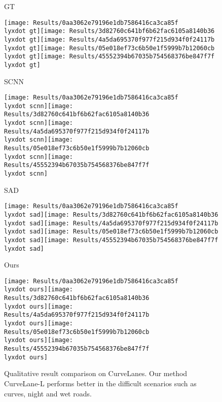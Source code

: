 \documentclass[runningheads]{llncs}
\newcommand{\lyxdot}{.}
\begin{document}
\begin{figure}[tb]
\begin{centering}
\begin{sideways}{GT}\end{sideways} \texttt{[image: Results/0aa3062e79196e1db7586416ca3ca85f\\lyxdot gt]}\texttt{[image: Results/3d82760c641bf6b62fac6105a8140b36\\lyxdot gt]}\texttt{[image: Results/4a5da695370f977f215d934f0f24117b\\lyxdot gt]}\texttt{[image: Results/05e018ef73c6b50e1f5999b7b12060cb\\lyxdot gt]}\texttt{[image: Results/45552394b67035b754568376be847f7f\\lyxdot gt]}
\par\end{centering}
\begin{centering}
\begin{sideways}{SCNN}\end{sideways} \texttt{[image: Results/0aa3062e79196e1db7586416ca3ca85f\\lyxdot scnn]}\texttt{[image: Results/3d82760c641bf6b62fac6105a8140b36\\lyxdot scnn]}\texttt{[image: Results/4a5da695370f977f215d934f0f24117b\\lyxdot scnn]}\texttt{[image: Results/05e018ef73c6b50e1f5999b7b12060cb\\lyxdot scnn]}\texttt{[image: Results/45552394b67035b754568376be847f7f\\lyxdot scnn]}
\par\end{centering}
\begin{centering}
\begin{sideways}{SAD}\end{sideways} \texttt{[image: Results/0aa3062e79196e1db7586416ca3ca85f\\lyxdot sad]}\texttt{[image: Results/3d82760c641bf6b62fac6105a8140b36\\lyxdot sad]}\texttt{[image: Results/4a5da695370f977f215d934f0f24117b\\lyxdot sad]}\texttt{[image: Results/05e018ef73c6b50e1f5999b7b12060cb\\lyxdot sad]}\texttt{[image: Results/45552394b67035b754568376be847f7f\\lyxdot sad]}
\par\end{centering}
\begin{centering}
\begin{sideways}{Ours}\end{sideways} \texttt{[image: Results/0aa3062e79196e1db7586416ca3ca85f\\lyxdot ours]}\texttt{[image: Results/3d82760c641bf6b62fac6105a8140b36\\lyxdot ours]}\texttt{[image: Results/4a5da695370f977f215d934f0f24117b\\lyxdot ours]}\texttt{[image: Results/05e018ef73c6b50e1f5999b7b12060cb\\lyxdot ours]}\texttt{[image: Results/45552394b67035b754568376be847f7f\\lyxdot ours]}
\par\end{centering}


\caption{\label{fig:Results-of-CurveLanes}Qualitative result comparison on
CurveLanes. Our method CurveLane-L performs
better in the difficult scenarios such as curves, night and wet roads.}

\end{figure}
\end{document}
